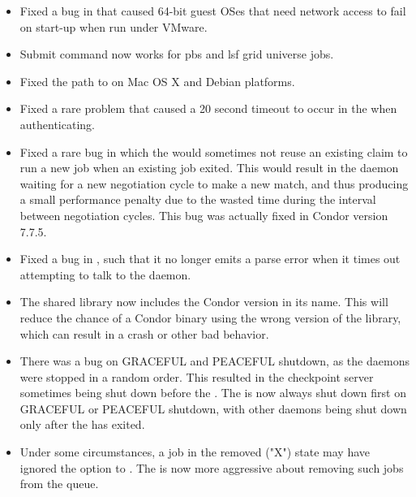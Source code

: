 \begin{itemize}

\item Fixed a bug in  that caused 64-bit guest OSes that
need network access to fail on start-up when run under VMware.

\item Submit command  now works for pbs and lsf
grid universe jobs.

\item Fixed the path to  on Mac OS X and Debian
platforms.

\item Fixed a rare problem that caused a 20 second timeout to occur in
the  when authenticating.

\item Fixed a rare bug in which the  would sometimes not reuse
an existing claim to run a new job when an existing job exited.  
This would result in the  daemon
waiting for a new negotiation cycle to make a new match,
and thus producing a small performance penalty due to the
wasted time during the interval between negotiation cycles.  
This bug was actually fixed in Condor version 7.7.5.

\item Fixed a bug in , such that it no longer emits a parse
error when it times out attempting to talk to the  daemon.

\item The shared library  now includes the Condor
version in its name. This will reduce the chance of a Condor binary
using the wrong version of the library, which can result in a crash or
other bad behavior.

\item There was a bug on GRACEFUL and PEACEFUL shutdown, 
as the daemons were stopped in a random order. 
This resulted in the checkpoint server 
sometimes being shut down before the .  
The  is now always shut down first on GRACEFUL or PEACEFUL 
shutdown, 
with other daemons being shut down only after the  has exited.

\item Under some circumstances, 
a job in the removed ("X") state may have ignored the  option 
to .
The  is now more aggressive about removing such jobs 
from the queue.


\end{itemize}
